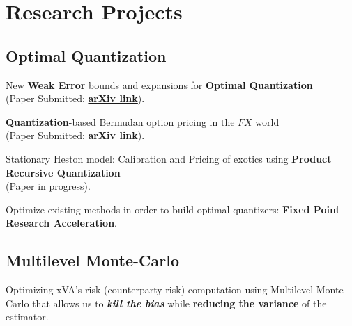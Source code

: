 \documentclass[]{deedy-resume-openfont}
\begin{document}
%
%
\lastupdated

%
%

%
%

\begin{minipage}[t]{0.33\textwidth}



\section{Research Projects}

\subsection{Optimal Quantization}
\vspace{\topsep}
\begin{tightemize}
\item New \textbf{Weak Error} bounds and expansions for \textbf{Optimal Quantization} \\ (Paper Submitted: \href{https://arxiv.org/abs/1903.10330}{\textbf{arXiv link}}).
\item \textbf{Quantization}-based Bermudan option pricing in the $FX$ world \\ (Paper Submitted: \href{https://arxiv.org/abs/1911.05462}{\textbf{arXiv link}}).
\item Stationary Heston model: Calibration and Pricing of exotics using \textbf{Product Recursive Quantization} \\ (Paper in progress).
\item Optimize existing methods in order to build optimal quantizers: \textbf{Fixed Point Research Acceleration}.
\end{tightemize}
\sectionsep
\subsection{Multilevel Monte-Carlo}
\vspace{\topsep}
\begin{tightemize}
\item Optimizing xVA's risk (counterparty risk) computation using Multilevel Monte-Carlo that allows us to \textbf{\textit{kill the bias}} while \textbf{reducing the variance} of the estimator.
\end{tightemize}





\end{minipage}
\end{document}
